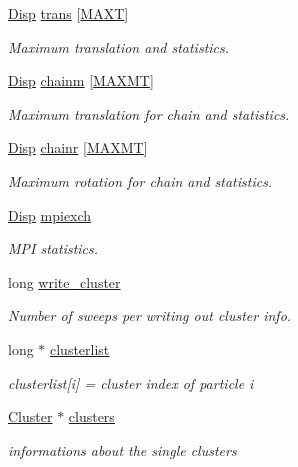 \begin{DoxyCompactItemize}
\hyperlink{class_disp}{Disp} \hyperlink{class_sim_a72db680d42b459fad8362d37914ae9a8}{trans} \mbox{[}\hyperlink{macros_8h_a3f79fdecc884eb98c97d1bdc77455295}{M\+A\+X\+T}\mbox{]}
\begin{DoxyCompactList}\small\item\em Maximum translation and statistics. \end{DoxyCompactList}\item 
\hyperlink{class_disp}{Disp} \hyperlink{class_sim_a7daf59f4e267bb80f1db9c607a0858ff}{chainm} \mbox{[}\hyperlink{macros_8h_ad002a98462c90c52983b122ab9e2059a}{M\+A\+X\+M\+T}\mbox{]}
\begin{DoxyCompactList}\small\item\em Maximum translation for chain and statistics. \end{DoxyCompactList}\item 
\hyperlink{class_disp}{Disp} \hyperlink{class_sim_adec41082dfe3aa3210a1fbc5f0ade382}{chainr} \mbox{[}\hyperlink{macros_8h_ad002a98462c90c52983b122ab9e2059a}{M\+A\+X\+M\+T}\mbox{]}
\begin{DoxyCompactList}\small\item\em Maximum rotation for chain and statistics. \end{DoxyCompactList}\item 
\hyperlink{class_disp}{Disp} \hyperlink{class_sim_a791a3f584b47c7a687be95b636a3528c}{mpiexch}
\begin{DoxyCompactList}\small\item\em M\+P\+I statistics. \end{DoxyCompactList}\item 
long \hyperlink{class_sim_ae3f308ef99bae8099bb581b89618ba09}{write\+\_\+cluster}
\begin{DoxyCompactList}\small\item\em Number of sweeps per writing out cluster info. \end{DoxyCompactList}\item 
long $\ast$ \hyperlink{class_sim_a1feddf9821ae3b1082ca29fd60adecca}{clusterlist}
\begin{DoxyCompactList}\small\item\em clusterlist\mbox{[}i\mbox{]} = cluster index of particle i \end{DoxyCompactList}\item 
\hyperlink{struct_cluster}{Cluster} $\ast$ \hyperlink{class_sim_acb85dbc7776928fe57c9d46972946f70}{clusters}
\begin{DoxyCompactList}\small\item\em informations about the single clusters \end{DoxyCompactList}\item 

\end{DoxyCompactItemize}
